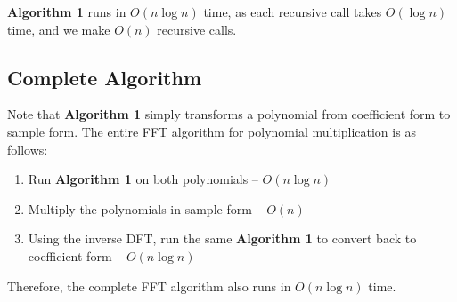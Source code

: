 \documentclass[11pt]{article}
\theoremstyle{plain}
\theoremstyle{definition}
\begin{document}
\textbf{Algorithm 1} runs in $O(n\log n)$ time, as each recursive call takes $O(\log n)$ time, and 
we make $O(n)$ recursive calls.

\subsection{Complete Algorithm}

Note that \textbf{Algorithm 1} simply transforms a polynomial from coefficient form to sample form.
The entire FFT algorithm for polynomial multiplication is as follows:

\begin{enumerate}
    \item Run \textbf{Algorithm 1} on both polynomials -- $O(n\log n)$
    \item Multiply the polynomials in sample form -- $O(n)$
    \item Using the inverse DFT, run the same \textbf{Algorithm 1} to convert back to coefficient 
        form -- $O(n\log n)$
\end{enumerate}

Therefore, the complete FFT algorithm also runs in $O(n\log n)$ time.
\end{document}
